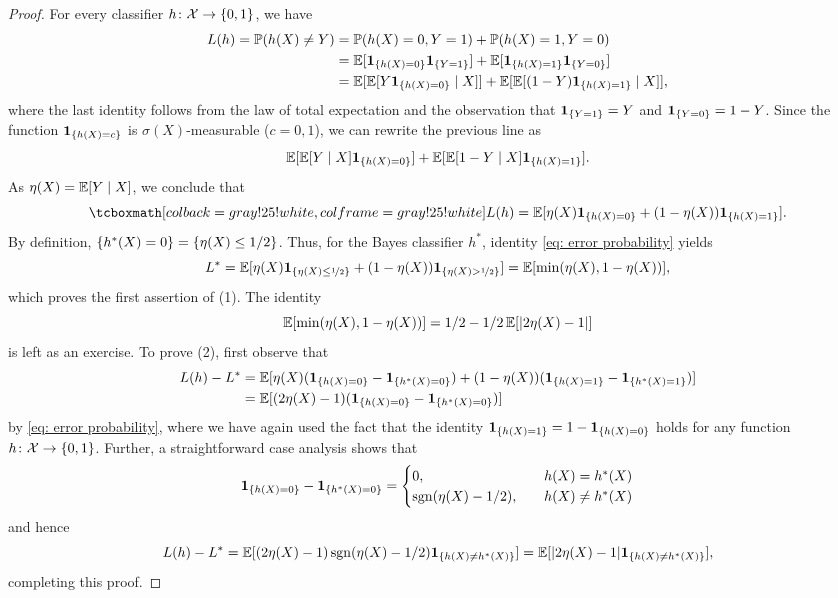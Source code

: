 \begin{proof}
For every classifier $h \colon \mathcal{X} \to \set{0, 1}$, we have
\begin{align*}
    L(h) = \Prob(h(X) \neq Y) &= \Prob(h(X) = 0, Y = 1) + \Prob(h(X) = 1, Y = 0) \\
    &= \Exp[\indSet{h(X) = 0} \indSet{Y = 1}] + \Exp[\indSet{h(X) = 1} \indSet{Y = 0}] \\
    &= \Exp[\Exp[Y \indSet{h(X) = 0} \given X]] + \Exp[\Exp[(1 - Y) \indSet{h(X) = 1} \given X]],
\end{align*}
where the last identity follows from the law of total expectation and the observation that $\indSet{Y = 1} = Y$ and $\indSet{Y = 0} = 1 - Y$. Since the function $\indSet{h(X) = c}$ is $\sigma(X)$-measurable ($c = 0, 1$), we can rewrite the previous line as
\[
    \Exp[\Exp[Y \given X] \indSet{h(X) = 0}] + \Exp[\Exp[1 - Y \given X] \indSet{h(X) = 1}].
\]
As $\eta(X) = \operatorname{\mathbb{E}}[Y \mathrel{|} X]$, we conclude that
\begin{equation}
    \label{eq: error probability}
    \highlightMath{
        L(h) = \Exp[\eta(X) \indSet{h(X) = 0} + (1 - \eta(X)) \indSet{h(X) = 1}].
    }
\end{equation}
By definition, $\set{h^*(X) = 0} = \set{\eta(X) \leq 1/2}$. Thus, for the Bayes classifier $h^*$, identity \eqref{eq: error probability} yields
\[
    L^* = \Exp[\eta(X) \indSet{\eta(X) \leq \nicefrac{1}{2}} + (1 - \eta(X)) \indSet{\eta(X) > \nicefrac{1}{2}}] = \Exp[\min(\eta(X), 1 - \eta(X))],
\]
which proves the first assertion of (1). The identity
\[
    \operatorname{\mathbb{E}}[\min(\eta(X), 1 - \eta(X))] = 1/2 - 1/2 \operatorname{\mathbb{E}}[\abs{2\eta(X) - 1 }]
\]
is left as an exercise. To prove (2), first observe that
\begin{align*}
    L(h) - L^* &= \Exp[\eta(X) (\indSet{h(X) = 0} - \indSet{h^*(X) = 0}) + (1 - \eta(X)) (\indSet{h(X) = 1} - \indSet{h^*(X) = 1})] \\
    &= \Exp[(2\eta(X) - 1) (\indSet{h(X) = 0} - \indSet{h^*(X) = 0})]
\end{align*}
by \eqref{eq: error probability}, where we have again used the fact that the identity $\indSet{h(X) = 1} = 1 - \indSet{h(X) = 0}$ holds for any function $h \colon \mathcal{X} \to \set{0, 1}$. Further, a straightforward case analysis shows that
\[
    \indSet{h(X) = 0} - \indSet{h^*(X) = 0} = \begin{cases}
        0, \quad & h(X) = h^*(X) \\
        \sgn(\eta(X) - 1/2), \quad & h(X) \neq h^*(X)
    \end{cases}
\]
and hence
\[
    L(h) - L^* = \Exp[(2\eta(X) - 1) \sgn(\eta(X) - 1/2) \indSet{h(X) \neq h^*(X)}] = \Exp[\abs{2\eta(X) - 1} \indSet{h(X) \neq h^*(X)}],
\]
completing this proof.
\end{proof}

